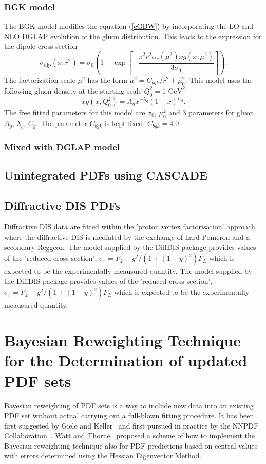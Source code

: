 \documentclass[11pt,a4paper]{article}
\begin{document}
\subsubsection{BGK model}
The BGK model modifies the equation (\ref{eGBW}) by incorporating the LO and NLO DGLAP evolution
of the gluon distribution. This leads to the expression for the dipole cross section
\begin{equation*}
\label{eBGK}
   \sigma_{\text{dip}}(x,r^{2}) = \sigma_{0} \left(1 - \exp \left[-\frac{\pi^{2} r^{2} \alpha_{s}(\mu^{2}) xg(x,\mu^{2})}{3 \sigma_{0}} \right]\right).
\end{equation*}
The factorization scale $\mu^{2}$ has the form $\mu^{2} = C_{bgk}/r^{2}+\mu^{2}_{0}$.
This model uses the following gluon density at the starting scale $Q_{0}^{2}=1\mbox{ GeV}^{2}$
\begin{equation*}
\label{eqTH730}
   xg(x,Q^{2}_{0}) = A_{g} x^{-\lambda_{g}}(1-x)^{C_{g}}.
\end{equation*}
The free fitted parameters for this model are $\sigma_{0}$, $\mu^{2}_{0}$ and 3 parameters for gluon $A_{g}$, $\lambda_{g}$, $C_{g}$. The parameter $C_{bgk}$ is kept fixed: $C_{bgk} = 4.0$. 
\subsubsection{Mixed with DGLAP model}
\subsection{Unintegrated PDFs using CASCADE}
\subsection{Diffractive DIS PDFs}
Diffractive DIS data are fitted within the 'proton vertex factorisation' approach where 
the diffractive DIS is mediated by the exchange of hard Pomeron and a secondary Reggeon.
The model supplied by the DiffDIS package provides values of the 'reduced cross section',
$\sigma_r = F_2 - y^2/(1+(1-y)^2) F_L$
which is expected to be the experimentally meausured quantity.
The model supplied by the DiffDIS package provides values of the 'reduced cross section',
$\sigma_r = F_2 - y^2/(1+(1-y)^2) F_L$
which is expected to be the experimentally meausured quantity.
\\
        

\section{Bayesian Reweighting Technique for the Determination of updated PDF sets}
Bayesian reweighting of PDF sets is a way to include new data into an existing PDF set without actual carrying out a full-blown fitting procedure. It has been first suggested by Giele and Keller~\cite{Giele:1998gw} and first pursued in practice by the NNPDF Collaboration~\cite{Ball:2011gg,Ball:2010gb}. Watt and Thorne~\cite{Watt:2012tq} proposed a scheme of how to implement the Bayesian reweighting technique also for PDF predictions based on central values with errors determined using the Hessian Eigenvector Method. 
\end{document}
